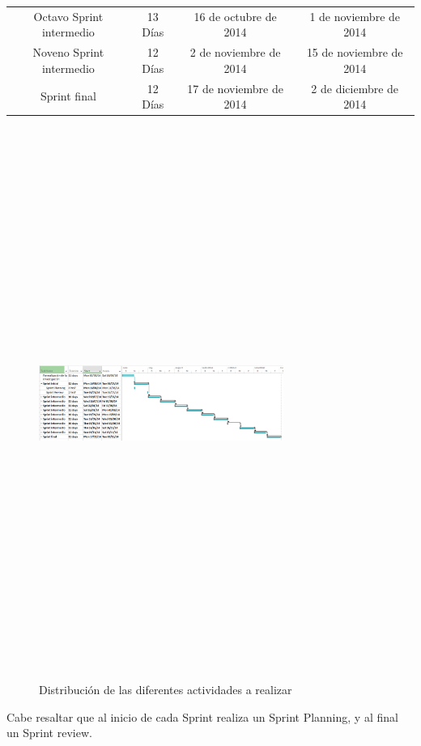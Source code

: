 \begin{table}[h]
\begin{center}
{\begin{tabular}{|llll|}
        \multicolumn{1}{|c}{Octavo Sprint intermedio} & \multicolumn{1}{c}{13 Días} & \multicolumn{1}{c}{16 de octubre de 2014} & \multicolumn{1}{c|}{1 de noviembre de 2014} \\ 
        \multicolumn{1}{|c}{Noveno Sprint intermedio} & \multicolumn{1}{c}{12 Días} & \multicolumn{1}{c}{2 de noviembre de 2014} & \multicolumn{1}{c|}{15 de noviembre de 2014} \\ 
        \multicolumn{1}{|c}{Sprint final} & \multicolumn{1}{c}{12 Días} & \multicolumn{1}{c}{17 de noviembre de 2014} & \multicolumn{1}{c|}{2 de diciembre de 2014} \\ 
        \hline
      \end{tabular}
      }
  \end{center}
\end{table}

\begin{figure}
  \begin{center}
    \includegraphics[angle=90,height=18cm,width=8cm]{./imagenes/cronograma_completo.PNG}
    \caption{Distribución de las diferentes actividades a realizar}
    \label{fig:cronograma}
  \end{center}
\end{figure}

Cabe resaltar que al inicio de cada Sprint realiza un Sprint Planning, y al final un Sprint review.
